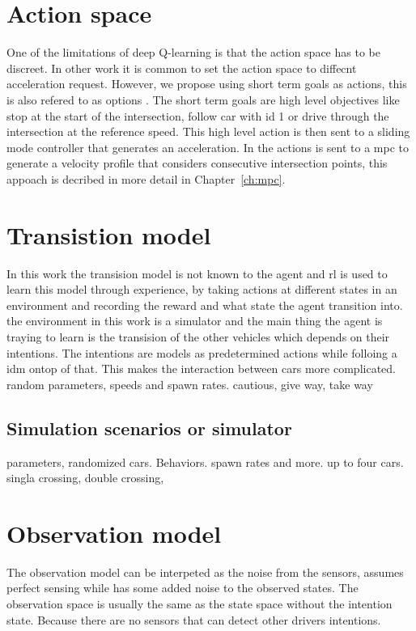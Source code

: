\section{Action space}
One of the limitations of deep Q-learning is that the action space has to be discreet. In other work it is common to set the action space to diffecnt acceleration request. However, we propose using short term goals as actions, this is also refered to as options \cite{options}. The short term goals are high level objectives like stop at the start of the intersection, follow car with id 1 or drive through the intersection at the reference speed. 
This high level action is then sent to a sliding mode controller that generates an acceleration. 
In \paperMPC the actions is sent to a \gls{mpc} to generate a velocity profile that considers consecutive intersection points, this appoach is decribed in more detail in Chapter~\ref{ch:mpc}.  

\section{Transistion model}
In this work the transision model is not known to the agent and \gls{rl} is used to learn this model through experience, by taking actions at different states in an environment and recording the reward and what state the agent transition into.
the environment in this work is a simulator and the main thing the agent is traying to learn is the transision of the other vehicles which depends on their intentions. 
The intentions are models as predetermined actions while folloing a \gls{idm} ontop of that. This makes the interaction between cars more complicated. 
\paperLSTM random parameters, speeds and spawn rates. 
\paperMPC cautious, give way, take way


\subsection{Simulation scenarios or simulator}
parameters, randomized cars. Behaviors. spawn rates and more. up to four cars. 
singla crossing, double crossing, 

\section{Observation model}
The observation model can be interpeted as the noise from the sensors, \paperLSTM assumes perfect sensing while \paperBelief has some added noise to the observed states. 
The observation space is usually the same as the state space without the intention state. Because there are no sensors that can detect other drivers intentions. 

